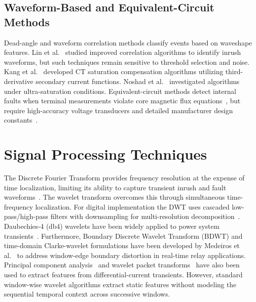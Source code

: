 \documentclass[12pt,a4paper,oneside]{report}
\begin{document}
\subsection{Waveform-Based and Equivalent-Circuit Methods}
Dead-angle and waveform correlation methods classify events based on waveshape features. Lin et al.~\cite{ref37} studied improved correlation algorithms to identify inrush waveforms, but such techniques remain sensitive to threshold selection and noise. Kang et al.~\cite{ref36} developed CT saturation compensation algorithms utilizing third-derivative secondary current functions. Noshad et al.~\cite{ref26} investigated algorithms under ultra-saturation conditions. Equivalent-circuit methods detect internal faults when terminal measurements violate core magnetic flux equations~\cite{ref26,ref28}, but require high-accuracy voltage transducers and detailed manufacturer design constants~\cite{ref30}.

\section{Signal Processing Techniques}
The Discrete Fourier Transform provides frequency resolution at the expense of time localization, limiting its ability to capture transient inrush and fault waveforms~\cite{ref5,ref27}. The wavelet transform overcomes this through simultaneous time-frequency localization. For digital implementation the DWT uses cascaded low-pass/high-pass filters with downsampling for multi-resolution decomposition~\cite{ref41}. Daubechies-4 (db4) wavelets have been widely applied to power system transients~\cite{ref5,ref6,ref14,ref24}. Furthermore, Boundary Discrete Wavelet Transform (BDWT) and time-domain Clarke-wavelet formulations have been developed by Medeiros et al.~\cite{ref38,ref39} to address window-edge boundary distortion in real-time relay applications. Principal component analysis~\cite{ref34} and wavelet packet transforms~\cite{ref31} have also been used to extract features from differential-current transients. However, standard window-wise wavelet algorithms extract static features without modeling the sequential temporal context across successive windows.
\end{document}
